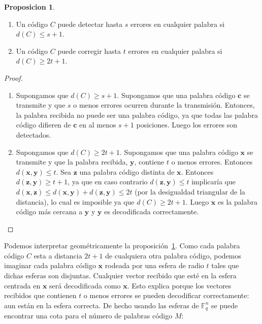 \documentclass[a4paper,11pt]{article}
\numberwithin{equation}{section}
\theoremstyle{definition} %
\newtheorem{proposicion}{Proposicion}[section]
\newcommand{\x}{\mathbf{x}}
\newcommand{\y}{\mathbf{y}}
\newcommand{\z}{\mathbf{z}}
\renewcommand{\c}{\mathbf{c}}
\newcommand{\Fqn}{\mathbb{F}_q^n}
\begin{document}
    \begin{proposicion}
    \label{th:distancia_errores}
        \begin{enumerate}
            \item Un código $C$ puede detectar hasta $s$ errores en cualquier palabra si $d(C) \leq s + 1$.
            \item Un código $C$ puede corregir hasta $t$ errores en cualquier palabra si $d(C) \geq 2 t + 1$.
        \end{enumerate}
    \end{proposicion}
    \begin{proof}
        \begin{enumerate}
            \item Supongamos que $d(C) \geq s + 1$. Supongamos que una palabra código $\c$ se transmite y que $s$ o menos errores ocurren durante la transmisión. Entonces, la palabra recibida no puede ser una palabra código, ya que todas las palabra código difieren de $\c$ en al menos $s + 1$ posiciones. Luego los errores son detectados.
            \item Supongamos que $d(C) \geq 2 t + 1$. Supongamos que una palabra código $\x$ se transmite y que la palabra recibida, $\y$, contiene $t$ o menos errores. Entonces $d(\x, \y) \leq t$. Sea $\z$ una palabra código distinta de $\x$. Entonces $d(\z, \y) \geq t + 1$, ya que en caso contrario $d(\z, \y) \leq t$ implicaría que $d(\x, \z) \leq d(\x, \y) + d(\z, \y) \leq 2 t$ (por la desigualdad triangular de la distancia), lo cual es imposible ya que $d(C) \geq 2 t + 1$. Luego $\x$ es la palabra código más cercana a $\y$ y $\y$ es decodificada correctamente.
        \end{enumerate}
    \end{proof}

    Podemos interpretar geométricamente la proposición~\ref{th:distancia_errores}. Como cada palabra código $C$ esta a distancia $2 t + 1$ de cualquiera otra palabra código, podemos imaginar cada palabra código $\x$ rodeada por una esfera de radio $t$ tales que dichas esferas son disjuntas. Cualquier vector recibido que esté en la esfera centrada en $\x$ será decodificada como $\x$. Esto explica porque los vectores recibidos que contienen $t$ o menos errores se pueden decodificar correctamente: aun están en la esfera correcta. De hecho usando las esferas de $\Fqn$ se puede encontrar una cota para el número de palabras código $M$:
\end{document}
